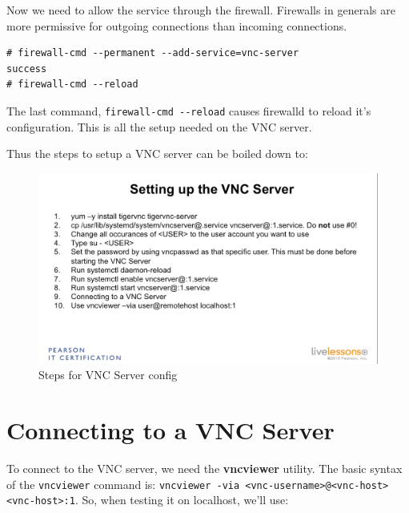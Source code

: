 \noindent
Now we need to allow the service through the firewall. Firewalls in generals are more permissive for outgoing connections than incoming connections. 

\vspace{-15pt}
\begin{verbatim}
# firewall-cmd --permanent --add-service=vnc-server
success
# firewall-cmd --reload
\end{verbatim}
\vspace{-10pt}

\noindent
The last command, \verb|firewall-cmd --reload| causes firewalld to reload it's configuration. This is all the setup needed on the VNC server. 

Thus the steps to setup a VNC server can be boiled down to:

\begin{figure}[H]
	\centering
	\includegraphics[width=0.9\linewidth]{Mod4/chapters/4.26.b}
	\caption{Steps for VNC Server config}
	\label{fig:4 Steps for VNC Server config}
\end{figure}

\section{Connecting to a VNC Server}
To connect to the VNC server, we need the \textbf{vncviewer} utility. The basic syntax of the \verb|vncviewer| command is: \verb|vncviewer -via <vnc-username>@<vnc-host> <vnc-host>:1|. So, when testing it on localhost, we'll use:

